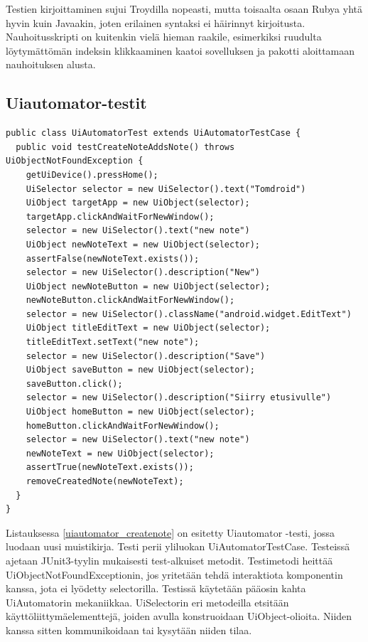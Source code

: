 Testien kirjoittaminen sujui Troydilla nopeasti, mutta toisaalta osaan Rubya yhtä hyvin kuin Javaakin, joten erilainen syntaksi ei häirinnyt kirjoitusta. Nauhoitusskripti on kuitenkin vielä hieman raakile, esimerkiksi ruudulta löytymättömän indeksin klikkaaminen kaatoi sovelluksen ja pakotti aloittamaan nauhoituksen alusta.

\subsection{Uiautomator-testit}

\begin{lstlisting}[float, label=uiautomator_createnote,caption=Muistikirjan luontitesti Uiautomatorilla]
public class UiAutomatorTest extends UiAutomatorTestCase {
  public void testCreateNoteAddsNote() throws UiObjectNotFoundException {
    getUiDevice().pressHome();
    UiSelector selector = new UiSelector().text("Tomdroid")
    UiObject targetApp = new UiObject(selector);
    targetApp.clickAndWaitForNewWindow();
    selector = new UiSelector().text("new note")
    UiObject newNoteText = new UiObject(selector);
    assertFalse(newNoteText.exists());
    selector = new UiSelector().description("New")
    UiObject newNoteButton = new UiObject(selector);
    newNoteButton.clickAndWaitForNewWindow();
    selector = new UiSelector().className("android.widget.EditText")
    UiObject titleEditText = new UiObject(selector);
    titleEditText.setText("new note");
    selector = new UiSelector().description("Save")
    UiObject saveButton = new UiObject(selector);
    saveButton.click();
    selector = new UiSelector().description("Siirry etusivulle")
    UiObject homeButton = new UiObject(selector);
    homeButton.clickAndWaitForNewWindow();
    selector = new UiSelector().text("new note")
    newNoteText = new UiObject(selector);
    assertTrue(newNoteText.exists());  
    removeCreatedNote(newNoteText);
  }
}
\end{lstlisting}

Listauksessa \ref{uiautomator_createnote} on esitetty Uiautomator -testi, jossa luodaan uusi muistikirja. Testi perii yliluokan UiAutomatorTestCase. Testeissä ajetaan JUnit3-tyylin mukaisesti test-alkuiset metodit. Testimetodi heittää UiObjectNotFoundExceptionin, jos yritetään tehdä interaktiota komponentin kanssa, jota ei lyödetty selectorilla. Testissä käytetään pääosin kahta UiAutomatorin mekaniikkaa. UiSelectorin eri metodeilla etsitään käyttöliittymäelementtejä, joiden avulla konstruoidaan UiObject-olioita. Niiden kanssa sitten kommunikoidaan tai kysytään niiden tilaa. 

